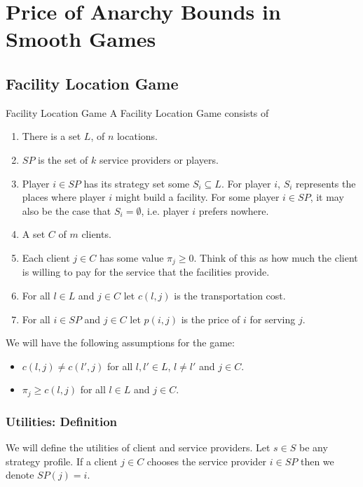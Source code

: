 \chapter{Price of Anarchy Bounds in Smooth Games}
\section{Facility Location Game}
\begin{Definition}{Facility Location Game}{}
	A Facility Location Game consists of \begin{enumerate}[label=(\roman*)]
		\item There is a set $L$, of $n$ locations.
		\item $SP$ is the set of $k$ service providers or players.
		\item Player $i\in SP$ has its strategy set some $S_i\subseteq L$. For player $i$, $S_i$ represents the places where player $i$ might build a facility. For some player $i\in SP$, it may also be the case that $S_i=\emptyset$, i.e. player $i$ prefers nowhere.
		\item A set $C$ of $m$ clients. 
		\item Each client $j\in C$ has some value $\pi_j\geq 0$. Think of this as how much the client is willing to pay for the service that the facilities provide.
		\item For all $l\in L$ and $j\in C$ let $c(l,j)$ is the transportation cost.
		\item For all $i\in SP$ and $j\in C$ let $p(i,j)$ is the price of $i$ for serving $j$.
	\end{enumerate}
\end{Definition}


\begin{assumption}We will have the following assumptions for the game:
	\begin{itemize}
		\item $c(l,j)\neq c(l',j)$ for all $l,l'\in L$, $l\neq l'$ and $j\in C$.
		\item $\pi_j\geq c(l,j)$ for all $l\in L$ and $j\in C$.
	\end{itemize}
\end{assumption}
\subsection{Utilities: Definition}
We will define the utilities of client and service providers. Let $s\in S$ be any strategy profile. If a client $j\in C$ chooses the service provider $i\in SP$  then we denote $SP(j)=i$. 

